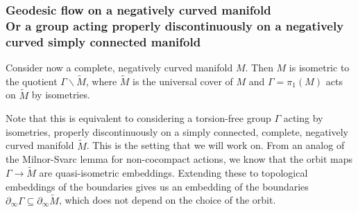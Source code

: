 \documentclass{report}
\begin{document}
\subsubsection{Geodesic flow on a negatively curved manifold\\Or a group acting properly discontinuously on a negatively curved simply connected manifold}
Consider now a complete, negatively curved manifold $M$.
Then $M$ is isometric to the quotient $\Gamma \backslash \tilde M$, where $\tilde M$ is the universal cover of $M$ and $\Gamma = \pi_1(M)$ acts on $\tilde M$ by isometries.

Note that this is equivalent to considering a torsion-free group $\Gamma$ acting by isometries, properly discontinuously on a simply connected, complete, negatively curved manifold $\tilde M$.
This is the setting that we will work on.
From an analog of the Milnor-Svarc lemma for non-cocompact actions, we know that the orbit maps $\Gamma \to \tilde M$ are quasi-isometric embeddings.
Extending these to topological embeddings of the boundaries gives us an embedding of the boundaries $\partial_\infty \Gamma \subseteq \partial_\infty \tilde M$, which does not depend on the choice of the orbit.
\end{document}
